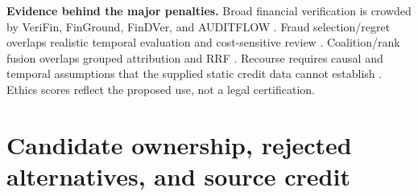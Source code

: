 \documentclass[11pt,a4paper]{article}
\newcommand{\pbreak}{\clearpage}
\newcommand{\lead}[1]{\textbf{\color{navy}#1}}
\begin{document}
\lead{Evidence behind the major penalties.} Broad financial verification is crowded by VeriFin, FinGround, FinDVer, and AUDITFLOW \cite{verifin,finground,findver,auditflow}. Fraud selection/regret overlaps realistic temporal evaluation and cost-sensitive review \cite{dal2018,topk,bergmeir}. Coalition/rank fusion overlaps grouped attribution and RRF \cite{groupshapley,rrf,biomark}. Recourse requires causal and temporal assumptions that the supplied static credit data cannot establish \cite{karimi,barocas,heloc,taiwan}. Ethics scores reflect the proposed use, not a legal certification.

\pbreak
\section{Candidate ownership, rejected alternatives, and source credit}
\end{document}
